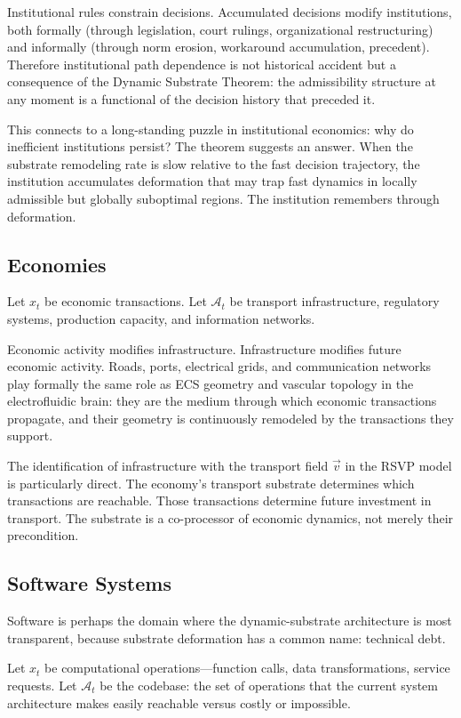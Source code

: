 \documentclass[12pt,a4paper]{article}
\begin{document}
Institutional rules constrain decisions. Accumulated decisions modify institutions, both formally (through legislation, court rulings, organizational restructuring) and informally (through norm erosion, workaround accumulation, precedent). Therefore institutional path dependence is not historical accident but a consequence of the Dynamic Substrate Theorem: the admissibility structure at any moment is a functional of the decision history that preceded it.

This connects to a long-standing puzzle in institutional economics: why do inefficient institutions persist? The theorem suggests an answer. When the substrate remodeling rate is slow relative to the fast decision trajectory, the institution accumulates deformation that may trap fast dynamics in locally admissible but globally suboptimal regions. The institution remembers through deformation.

\subsection{Economies}

Let $x_t$ be economic transactions. Let $\mathcal{A}_t$ be transport infrastructure, regulatory systems, production capacity, and information networks.

Economic activity modifies infrastructure. Infrastructure modifies future economic activity. Roads, ports, electrical grids, and communication networks play formally the same role as ECS geometry and vascular topology in the electrofluidic brain: they are the medium through which economic transactions propagate, and their geometry is continuously remodeled by the transactions they support.

The identification of infrastructure with the transport field $\vec{v}$ in the RSVP model is particularly direct. The economy's transport substrate determines which transactions are reachable. Those transactions determine future investment in transport. The substrate is a co-processor of economic dynamics, not merely their precondition.

\subsection{Software Systems}

Software is perhaps the domain where the dynamic-substrate architecture is most transparent, because substrate deformation has a common name: technical debt.

Let $x_t$ be computational operations---function calls, data transformations, service requests. Let $\mathcal{A}_t$ be the codebase: the set of operations that the current system architecture makes easily reachable versus costly or impossible.
\end{document}
